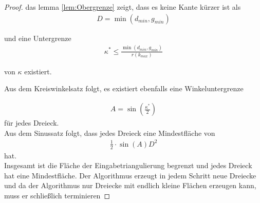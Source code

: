 \begin{proof}
das lemma \ref{lem:Obergrenze} zeigt, dass es keine Kante kürzer ist als  \begin{align*}
    D = \min(d_{min},g_{min})
\end{align*}

und eine Untergrenze \begin{align*}
    \kappa^* \leq \frac{\min(d_{min},g_{min})}{r(k_{max})}
\end{align*}

von $\kappa$ existiert.

Aus dem Kreiswinkelsatz folgt, es existiert ebenfalls eine Winkeluntergrenze 

\begin{align*}
    A = \sin(\frac{\kappa^*}{2})
\end{align*}
für jedes Dreieck.\\
Aus dem Sinussatz folgt, dass jedes Dreieck eine Mindestfläche von \begin{align*}
    \frac{1}{2} \cdot \sin(A)D^2 
\end{align*}
hat.\\

Insgesamt ist die Fläche der Eingabetriangulierung begrenzt und jedes Dreieck hat eine Mindestfläche. Der Algorithmus erzeugt in jedem Schritt neue Dreiecke und da der Algorithmus nur Dreiecke mit endlich kleine Flächen erzeugen kann, muss er schließlich terminieren
\end{proof}








